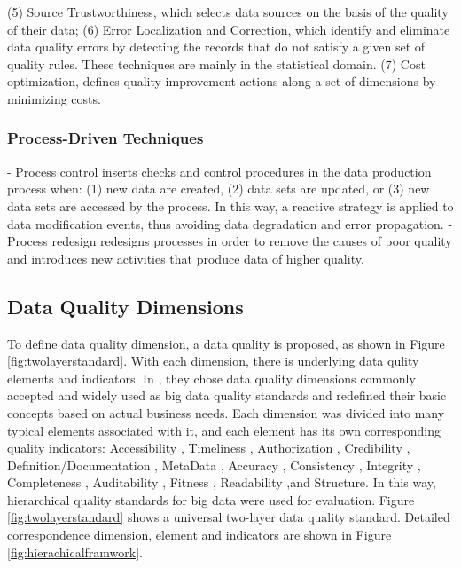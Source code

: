 \documentclass[pdftex,english,oribibl]{llncs}
\begin{document}
(5) Source Trustworthiness, which selects data sources on the basis of the quality of their data;
(6) Error Localization and Correction, which identify and eliminate data quality errors by detecting the records that do not satisfy a given set of quality rules. These techniques are mainly in the statistical domain.
(7) Cost optimization, defines quality improvement actions along a set of dimensions by minimizing costs.

\subsubsection{Process-Driven Techniques}
- Process control inserts checks and control procedures in the data production process when: (1) new data are created, (2) data sets are updated, or (3) new data sets are accessed by the process. In this way, a reactive strategy is applied to data modification events, thus avoiding data degradation and error propagation.
- Process redesign redesigns processes in order to remove the causes of poor quality and introduces new activities that produce data of higher quality.
\begin{comment}
\subsubsection{Techniques}
 - Column analysis: Number of (unique) values and the number of instances per value as percentage from the total number of instances in that column
 - Cross-domain analysis
 - Data validation
 - Domain analysis
 - Lexical analysis
 - Matching algorithms: identify duplicates
 - Primary key and foreign key analysis (PK/FK analysis) : are good candidates for a PK/FK
 - Schema matching: two attributes are semantically equivalent
 - Semantic profiling
\end{comment}

\subsection{Data Quality Dimensions}\label{sec:DataQualityDimensions}

To define data quality dimension, a data quality is proposed, as shown in Figure \ref{fig:twolayerstandard}. With each dimension, there is underlying data qulity elements and indicators.
In \citet{Cai2005ChallnegesOfDataQuality}, they chose data quality dimensions commonly accepted and widely used as big data quality standards and redefined their basic concepts based on actual business needs.
Each dimension was divided into many typical elements associated with it, and each element has its own corresponding quality indicators: Accessibility
, Timeliness
, Authorization
, Credibility
, Definition/Documentation
, MetaData
, Accuracy
, Consistency
, Integrity
, Completeness
, Auditability
, Fitness
, Readability
,and Structure.
In this way, hierarchical quality standards for big data were used for evaluation.
Figure \ref{fig:twolayerstandard} shows a universal two-layer data quality standard. Detailed correspondence dimension, element and indicators are shown in Figure \ref{fig:hierachicalframwork}.
\end{document}
